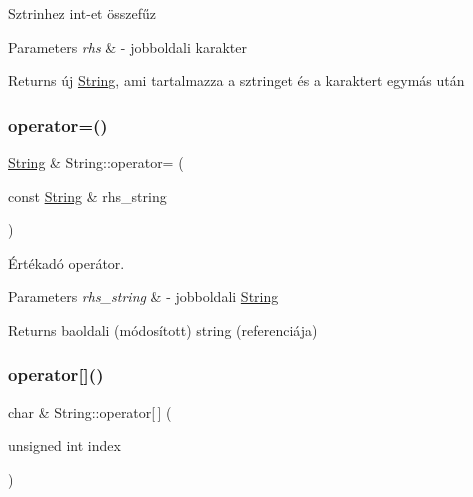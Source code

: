 Sztrinhez int-\/et összefűz 
\begin{DoxyParams}{Parameters}
{\em rhs} & -\/ jobboldali karakter \\
\hline
\end{DoxyParams}
\begin{DoxyReturn}{Returns}
új \mbox{\hyperlink{class_string}{String}}, ami tartalmazza a sztringet és a karaktert egymás után 
\end{DoxyReturn}
\mbox{\label{class_string_a71dbd70fd524c5193dac85c853695a12}} 
\subsubsection{\texorpdfstring{operator=()}{operator=()}}
{\footnotesize\ttfamily \mbox{\hyperlink{class_string}{String}} \& String\+::operator= (\begin{DoxyParamCaption}\item[{const \mbox{\hyperlink{class_string}{String}} \&}]{rhs\+\_\+string }\end{DoxyParamCaption})}

Értékadó operátor. 
\begin{DoxyParams}{Parameters}
{\em rhs\+\_\+string} & -\/ jobboldali \mbox{\hyperlink{class_string}{String}} \\
\hline
\end{DoxyParams}
\begin{DoxyReturn}{Returns}
baoldali (módosított) string (referenciája) 
\end{DoxyReturn}
\mbox{\label{class_string_a92a0681d0031d7e99c12c245cc22367e}} 
\subsubsection{\texorpdfstring{operator[]()}{operator[]()}\hspace{0.1cm}{\footnotesize\ttfamily [1/2]}}
{\footnotesize\ttfamily char \& String\+::operator\mbox{[}$\,$\mbox{]} (\begin{DoxyParamCaption}\item[{unsigned int}]{index }\end{DoxyParamCaption})}

